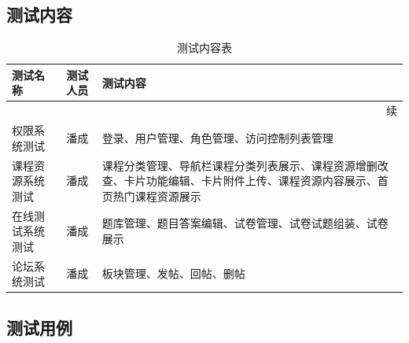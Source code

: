 \documentclass[titlepage,UTF8,linespread=1.5]{ctexart}
\begin{document}
\subsection{测试内容}
\begin{longtable}{|p{8em}|p{4em}|p{25em}|}
    \caption{测试内容表}\label{tab:test_content} \\\hline
    测试名称         & 测试人员 & 测试内容 \\\hline
    \endfirsthead
    \multicolumn{3}{r}{{续\tablename\thetable{}}} \\\hline
    \endhead
    权限系统测试     & 潘成     & 登录、用户管理、角色管理、访问控制列表管理 \\\hline
    课程资源系统测试 & 潘成     & 课程分类管理、导航栏课程分类列表展示、课程资源增删改查、卡片功能编辑、卡片附件上传、课程资源内容展示、首页热门课程资源展示 \\\hline
    在线测试系统测试 & 潘成     & 题库管理、题目答案编辑、试卷管理、试卷试题组装、试卷展示 \\\hline
    论坛系统测试     & 潘成     & 板块管理、发帖、回帖、删帖 \\\hline
\end{longtable}

\subsection{测试用例}
\end{document}
